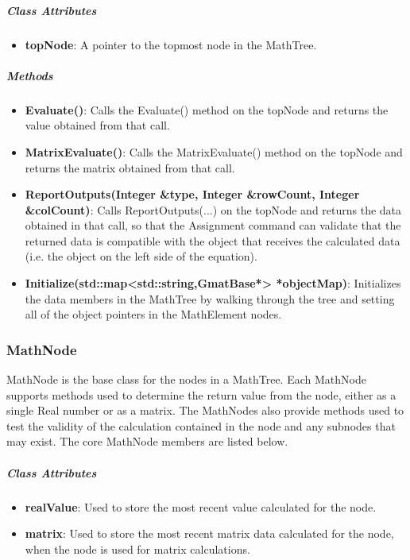 \subparagraph{\textit{Class Attributes}}
\begin{itemize}
\item \textbf{topNode}: A pointer to the topmost node in the MathTree.
\end{itemize}

\subparagraph{\textit{Methods}}
\begin{itemize}
\item \textbf{Evaluate()}: Calls the Evaluate() method on the topNode and returns the value obtained
from that call.
\item \textbf{MatrixEvaluate()}: Calls the MatrixEvaluate() method on the topNode and returns the
matrix obtained from that call.
\item \textbf{ReportOutputs(Integer \&type, Integer \&rowCount, Integer \&colCount)}:  Calls
ReportOutputs(...) on the topNode and returns the data obtained in that call, so that the Assignment
command can validate that the returned data is compatible with the object that receives the
calculated data (i.e. the object on the left side of the equation).
\item \textbf{Initialize(std::map<std::string,GmatBase*> *objectMap)}: Initializes the data members
in the MathTree by walking through the tree and setting all of the object pointers in the
MathElement nodes.
\end{itemize}

\subsubsection{MathNode}

MathNode is the base class for the nodes in a MathTree.  Each MathNode supports methods used to
determine the return value from the node, either as a single Real number or as a matrix.  The
MathNodes also provide methods used to test the validity of the calculation contained in the node
and any subnodes that may exist.  The core MathNode members are listed below.

\subparagraph{\textit{Class Attributes}}
\begin{itemize}
\item \textbf{realValue}: Used to store the most recent value calculated for the node.
\item \textbf{matrix}: Used to store the most recent matrix data calculated for the node, when the
node is used for matrix calculations.
\end{itemize}

